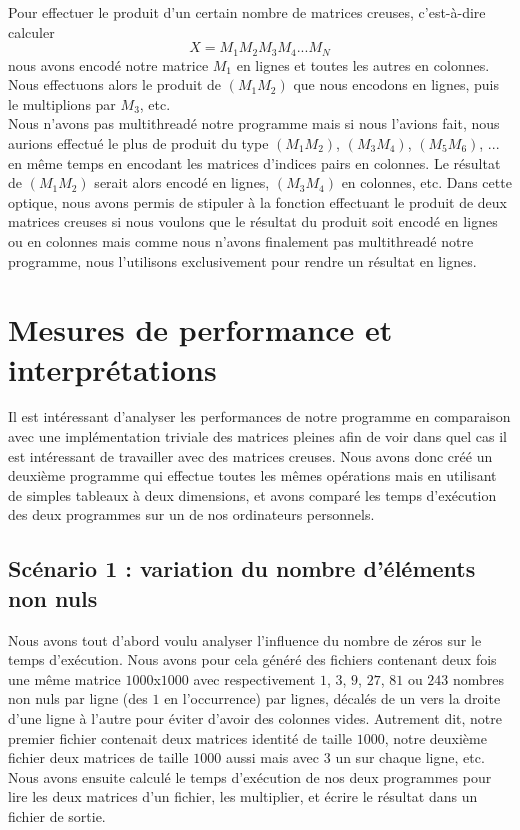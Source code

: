 \documentclass[12pt,a4paper]{article}
\begin{document}
Pour effectuer le produit d'un certain nombre de matrices creuses, c'est-à-dire calculer $$X = M_1 M_2 M_3 M_4 ... M_N$$
nous avons encodé notre matrice $M_1$ en lignes et toutes les autres en colonnes. Nous effectuons alors le produit de $(M_1 M_2)$ que nous encodons en lignes, puis le multiplions par $M_3$, etc.\\

Nous n'avons pas multithreadé notre programme mais si nous l'avions fait, nous aurions effectué le plus de produit du type $(M_1 M_2)$, $(M_3 M_4)$, $(M_5 M_6)$, ... en même temps en encodant les matrices d'indices pairs en colonnes. Le résultat de $(M_1 M_2)$ serait alors encodé en lignes, $(M_3 M_4)$ en colonnes, etc. Dans cette optique, nous avons permis de stipuler à la fonction effectuant le produit de deux matrices creuses si nous voulons que le résultat du produit soit encodé en lignes ou en colonnes mais comme nous n'avons finalement pas multithreadé notre programme, nous l'utilisons exclusivement pour rendre un résultat en lignes.


\section{Mesures de performance et interprétations}

Il est intéressant d'analyser les performances de notre programme en comparaison avec une implémentation triviale des matrices pleines afin de voir dans quel cas il est intéressant de travailler avec des matrices creuses. Nous avons donc créé un deuxième programme qui effectue toutes les mêmes opérations mais en utilisant de simples tableaux à deux dimensions, et avons comparé les temps d'exécution des deux programmes sur un de nos ordinateurs personnels.

\subsection{Scénario 1 : variation du nombre d'éléments non nuls}

Nous avons tout d'abord voulu analyser l'influence du nombre de zéros sur le temps d'exécution. Nous avons pour cela généré des fichiers contenant deux fois une même matrice $1000$x$1000$ avec respectivement $1$, $3$, $9$, $27$, $81$ ou $243$ nombres non nuls par ligne (des $1$ en l'occurrence) par lignes, décalés de un vers la droite d'une ligne à l'autre pour éviter d'avoir des colonnes vides. Autrement dit, notre premier fichier contenait  deux matrices identité de taille $1000$, notre deuxième fichier deux matrices de taille $1000$ aussi mais avec $3$ un sur chaque ligne, etc. Nous avons ensuite calculé le temps d'exécution de nos deux programmes pour lire les deux matrices d'un fichier, les multiplier, et écrire le résultat dans un fichier de sortie. 
\end{document}
